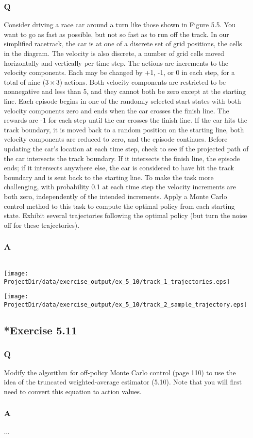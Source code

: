 \subsubsection{Q}
Consider driving a race car around a turn like those shown in Figure 5.5. You want to go as fast as possible, but not so fast as to run off the track. In our simplified racetrack, the car is at one of a discrete set of grid positions, the cells in the diagram. The velocity is also discrete, a number of grid cells moved horizontally and vertically per time step. The actions are increments to the velocity components. Each may be changed by +1, -1, or 0 in each step, for a total of nine ($3 \times 3$) actions. Both velocity components are restricted to be nonnegative and less than 5, and they cannot both be zero except at the starting line. Each episode begins in one of the randomly selected start states with both velocity components zero and ends when the car crosses the finish line. The rewards are -1 for each step until the car crosses the finish line. If the car hits the track boundary, it is moved back to a random position on the starting line, both velocity components are reduced to zero, and the episode continues. Before updating the car’s location at each time step, check to see if the projected path of the car intersects the track boundary. If it intersects the finish line, the episode ends; if it intersects anywhere else, the car is considered to have hit the track boundary and is sent back to the starting line. To make the task more challenging, with probability 0.1 at each time step the velocity increments are both zero, independently of the intended increments. Apply a Monte Carlo control method to this task to compute the optimal policy from each starting state. Exhibit several trajectories following the optimal policy (but turn the noise off for these trajectories).
\subsubsection{A}
\ProgrammingExercise\\
\texttt{[image: \\ProjectDir/data/exercise\_output/ex\_5\_10/track\_1\_trajectories.eps]}

\texttt{[image: \\ProjectDir/data/exercise\_output/ex\_5\_10/track\_2\_sample\_trajectory.eps]}

\subsection{*Exercise 5.11}
\subsubsection{Q}
Modify the algorithm for off-policy Monte Carlo control (page 110) to use the idea of the truncated weighted-average estimator (5.10). Note that you will first need to convert this equation to action values.

\subsubsection{A}
... 